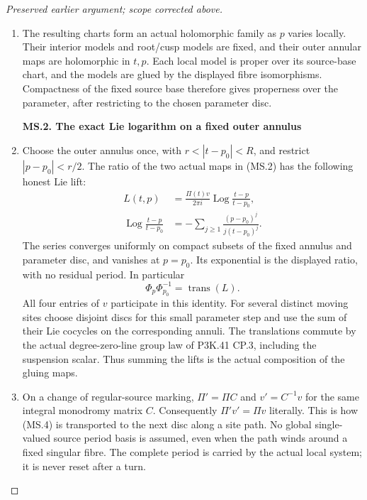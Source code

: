 \begin{proof}[Preserved earlier argument; scope corrected above]
\begin{enumerate}[label=\arabic*.]
\item The resulting charts form an actual holomorphic family as \(p\)
varies locally. Their interior models and root/cusp models are fixed,
and their outer annular maps are holomorphic in \(t,p\). Each local model is proper over its source-base chart, and the
models are glued by the displayed fibre isomorphisms. Compactness of
the fixed source base therefore gives properness over the parameter,
after restricting to the chosen parameter disc.

\par

\medskip\noindent\textbf{MS.2. The exact Lie logarithm on a fixed outer annulus}

\par\nobreak

\item Choose the outer annulus once, with
\(r<|t-p_0|<R\), and restrict \(|p-p_0|<r/2\). The ratio of
the two actual maps in (MS.2) has the following honest Lie lift:
\[
 \begin{split}
 L(t,p)&=\frac{\Pi(t)v}{2\pi i}
                   \operatorname{Log}\frac{t-p}{t-p_0},\\
 \operatorname{Log}\frac{t-p}{t-p_0}
       &=-\sum_{j\geq1}\frac{(p-p_0)^j}{j(t-p_0)^j}.
 \end{split}                                             \tag{MS.4}
\]
The series converges uniformly on compact subsets of the fixed annulus
and parameter disc, and vanishes at \(p=p_0\). Its exponential is
the displayed ratio, with no residual period. In particular
\[
       \Phi_p\Phi_{p_0}^{-1}=\operatorname{trans}(L).      \tag{MS.5}
\]
All four entries of \(v\) participate in this identity. For several
distinct moving sites choose disjoint discs for this small parameter
step and use the sum of their Lie cocycles on the corresponding
annuli. The translations commute by the actual degree-zero-line group
law of P3K.41 CP.3, including the suspension scalar. Thus summing the
lifts is the actual composition of the gluing maps.

\item On a change of regular-source marking, \(\Pi' =\Pi C\) and
\(v'=C^{-1}v\) for the same integral monodromy matrix \(C\).
Consequently \(\Pi'v'=\Pi v\) literally. This is how (MS.4)
is transported to the next disc along a site path. No global
single-valued source period basis is assumed, even when the path
winds around a fixed singular fibre. The complete period is carried
by the actual local system; it is never reset after a turn.


\end{enumerate}
\end{proof}
